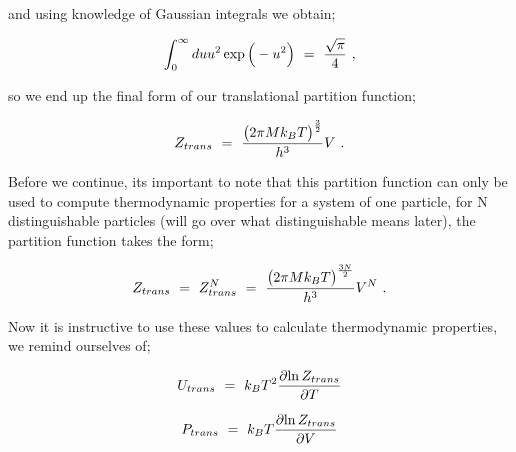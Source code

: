 \documentclass{article}
\begin{document}
and using knowledge of Gaussian integrals we obtain;

\begin{equation} \label{eq:256}
\int_{0}^{\infty} d u u^2 \exp{\Big(-u^2 \Big)} \hspace{0.125cm} = \hspace{0.125cm} \frac{\sqrt{\pi}}{4} \hspace{0.125cm} ,
\end{equation}

so we end up the final form of our translational partition function;

\begin{equation} \label{eq:256}
Z_{trans} \hspace{0.125cm} = \hspace{0.125cm} \frac{\big( 2 \pi M k_B T \big)^{\frac{3}{2}}}{h^3} V \hspace{0.125cm} .
\end{equation}

Before we continue, its important to note that this partition function can only be used to compute thermodynamic properties for a system of one particle, for N distinguishable particles (will go over what distinguishable means later), the partition function takes the form;

\begin{equation} \label{eq:256}
Z_{trans} \hspace{0.125cm} = \hspace{0.125cm} Z_{trans}^{N} \hspace{0.125cm} = \hspace{0.125cm} \frac{\big( 2 \pi M k_B T \big)^{\frac{3N}{2}}}{h^3} V^N \hspace{0.125cm} .
\end{equation}

Now it is instructive to use these values to calculate thermodynamic properties, we remind ourselves of;

\begin{equation} \label{eq:256}
U_{trans} \hspace{0.125cm} = \hspace{0.125cm} k_B T^2 \frac{\partial{\ln{Z_{trans}}}}{\partial{T}}
\end{equation}

\begin{equation} \label{eq:256}
P_{trans} \hspace{0.125cm} = \hspace{0.125cm} k_B T \frac{\partial{\ln{Z_{trans}}}}{\partial{V}}
\end{equation}
\end{document}
